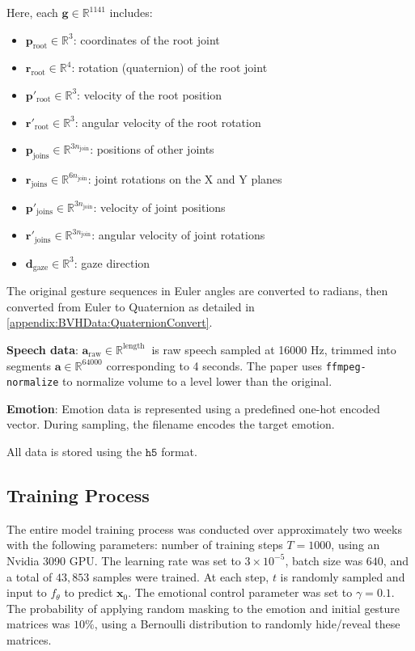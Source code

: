 Here, each $\mathbf{g} \in \mathbb{R}^{1141}$ includes:
{
	\begin{itemize}
		\item $\mathbf{p}_{\text{root}} \in \mathbb{R}^3$: coordinates of the root joint
		\item $\mathbf{r}_{\text{root}} \in \mathbb{R}^4$: rotation (quaternion) of the root joint
		\item $\mathbf{p}'_{\text{root}} \in \mathbb{R}^3$: velocity of the root position
		\item $\mathbf{r}'_{\text{root}} \in \mathbb{R}^3$: angular velocity of the root rotation
		
		\item $\mathbf{p}_{\text{joins}} \in \mathbb{R}^{3 n_{\text{join} }}$: positions of other joints
		\item $\mathbf{r}_{\text{joins}} \in \mathbb{R}^{6 n_{\text{join} }}$: joint rotations on the X and Y planes
		\item $\mathbf{p}'_{\text{joins}} \in \mathbb{R}^{3n_{\text{join} }}$: velocity of joint positions
		\item $\mathbf{r}'_{\text{joins}} \in \mathbb{R}^{3n_{\text{join} }}$: angular velocity of joint rotations
		\item $\mathbf{d}_{\text{gaze}} \in \mathbb{R}^3$: gaze direction
\end{itemize}}

The original gesture sequences in Euler angles are converted to radians, then converted from Euler to Quaternion as detailed in \autoref{appendix:BVHData:QuaternionConvert}.

\textbf{Speech data}: $\mathbf{a}_{\text{raw}} \in \mathbb{R}^{ \text{length } }$ is raw speech sampled at 16000 Hz, trimmed into segments $\mathbf{a} \in \mathbb{R}^{64000}$ corresponding to 4 seconds. The paper uses \texttt{ffmpeg-normalize} to normalize volume to a level lower than the original.

\textbf{Emotion}: Emotion data is represented using a predefined one-hot encoded vector. During sampling, the filename encodes the target emotion.

All data is stored using the $\texttt{h5}$ format.

\subsection{Training Process}

The entire model training process was conducted over approximately two weeks with the following parameters: number of training steps $T = 1000$, using an Nvidia 3090 GPU. The learning rate was set to $3 \times 10^{-5}$, batch size was $640$, and a total of $43,853$ samples were trained. At each step, $t$ is randomly sampled and input to $f_{\theta}$ to predict $\mathbf{x}_{0}$. The emotional control parameter was set to $\gamma = 0.1$. The probability of applying random masking to the emotion and initial gesture matrices was $10\%$, using a Bernoulli distribution to randomly hide/reveal these matrices.

